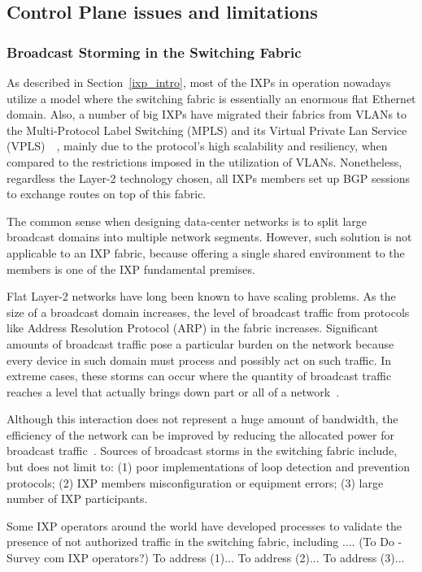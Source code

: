 \documentclass[conference]{IEEEtran/IEEEtran}
\begin{document}
\subsection{Control Plane issues and limitations}
\label{subsec:issues_cp}

\subsubsection{Broadcast Storming in the Switching Fabric}
\label{subsubsec:broadcast_storm}
As described in Section~\ref{ixp_intro}, most of the IXPs in operation nowadays utilize a model where the switching fabric is essentially an enormous flat Ethernet domain. Also, a number of big IXPs have migrated their fabrics from VLANs to the Multi-Protocol Label Switching (MPLS) and its Virtual Private Lan Service (VPLS)~\cite{rfc4761}~\cite{rfc4762}, mainly due to the protocol's high scalability and resiliency, when compared to the restrictions imposed in the utilization of VLANs. Nonetheless, regardless the Layer-2 technology chosen, all IXPs members set up BGP sessions to exchange routes on top of this fabric.

The common sense when designing data-center networks is to split large broadcast domains into multiple network segments. However, such solution is not applicable to an IXP fabric, because offering a single shared environment to the members is one of the IXP fundamental premises. 

Flat Layer-2 networks have long been known to have scaling problems. As the size of a broadcast domain increases, the level of broadcast traffic from protocols like Address Resolution Protocol (ARP) in the fabric increases. Significant amounts of broadcast traffic pose a particular burden on the network because every device in such domain must process and possibly act on such traffic. In extreme cases, these storms can occur where the quantity of broadcast traffic reaches a level that actually brings down part or all of a network~\cite{rfc6820}. 

Although this interaction does not represent a huge amount of bandwidth, the efficiency of the network can be improved by reducing the allocated power for broadcast traffic~\cite{ams2013victor}. Sources of broadcast storms in the switching fabric include, but does not limit to: (1) poor implementations of loop detection and prevention protocols; (2) IXP members misconfiguration or equipment errors; (3) large number of IXP participants. 

Some IXP operators around the world have developed processes to validate the presence of not authorized traffic in the switching fabric, including .... (To Do - Survey com IXP operators?)
To address (1)...
To address (2)...
To address (3)...
\end{document}
